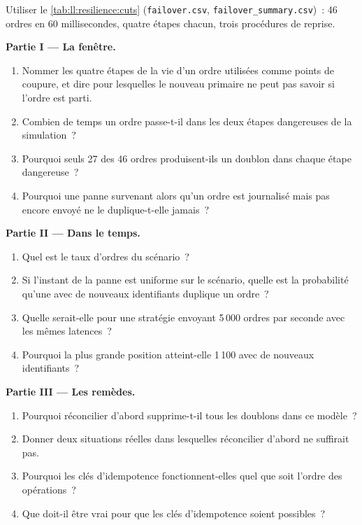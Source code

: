 \begin{problem}\label{pb:ll:resilience:1}
Utiliser le \cref{tab:ll:resilience:cuts} (\texttt{failover.csv}, \texttt{failover\_summary.csv})~: 46 ordres en 60 millisecondes, quatre
étapes chacun, trois procédures de reprise.

\medskip\noindent\textbf{Partie I --- La fenêtre.}
\begin{enumerate}
\item Nommer les quatre étapes de la vie d'un ordre utilisées comme points de coupure, et dire pour lesquelles le nouveau primaire ne peut pas savoir
si l'ordre est parti.
\item Combien de temps un ordre passe-t-il dans les deux étapes dangereuses de la simulation~?
\item Pourquoi seuls 27 des 46 ordres produisent-ils un doublon dans chaque étape dangereuse~?
\item Pourquoi une panne survenant alors qu'un ordre est journalisé mais pas encore envoyé ne le duplique-t-elle jamais~?
\end{enumerate}

\medskip\noindent\textbf{Partie II --- Dans le temps.}
\begin{enumerate}[resume]
\item Quel est le taux d'ordres du scénario~?
\item Si l'instant de la panne est uniforme sur le scénario, quelle est la probabilité qu'une  avec de nouveaux identifiants duplique
un ordre~?
\item Quelle serait-elle pour une stratégie envoyant 5\,000 ordres par seconde avec les mêmes latences~?
\item Pourquoi la plus grande position atteint-elle 1\,100 avec de nouveaux identifiants~?
\end{enumerate}

\medskip\noindent\textbf{Partie III --- Les remèdes.}
\begin{enumerate}[resume]
\item Pourquoi réconcilier d'abord supprime-t-il tous les doublons dans ce modèle~?
\item Donner deux situations réelles dans lesquelles réconcilier d'abord ne suffirait pas.
\item Pourquoi les clés d'idempotence fonctionnent-elles quel que soit l'ordre des opérations~?
\item Que doit-il être vrai pour que les clés d'idempotence soient possibles~?
\end{enumerate}


\end{problem}
